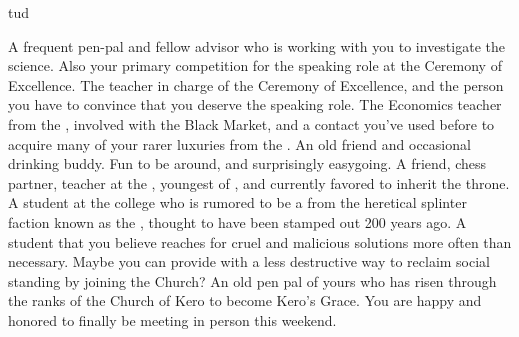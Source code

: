 tud\documentclass[char]{GL2020}
\begin{document}
\begin{contacts}
    \contact{\cCurse{}} A frequent pen-pal and fellow \pFarm{} advisor who is working with you to investigate the \pTech{} science. Also your primary competition for the speaking role at the Ceremony of Excellence.
    \contact{\cMusic{}} The teacher in charge of the Ceremony of Excellence, and the person you have to convince that you deserve the speaking role.
    \contact{\cChupSecond{}} The Economics teacher from the \pShip{}, involved with the Black Market, and a contact you've used before to acquire many of your rarer luxuries from the \pTech{}.
    \contact{\cWildCard{}} An old friend and occasional drinking buddy. Fun to be around, and surprisingly easygoing.
    \contact{\cPrince{}} A friend, chess partner, teacher at the \pSc{}, youngest \cPrince{\offspring} of \cQueen{\Monarch} \cQueen{}, and currently favored to inherit the throne.
    \contact{\cDisney{}} A student at the college who is rumored to be a \cDisney{\cleric} from the heretical splinter faction known as the \cDisneySect{}, thought to have been stamped out 200 years ago.
     \contact{\cLibAssist{}} A student that you believe reaches for cruel and malicious solutions more often than necessary. Maybe you can provide \cLibAssist{} with a less destructive way to reclaim social standing by joining the Church?
    \contact{\cAntiChup{}} An old pen pal of yours who has risen through the ranks of the Church of Kero to become Kero’s Grace. You are happy and honored to finally be meeting \cAntiChup{\them} in person this weekend.
\end{contacts}
\end{document}
